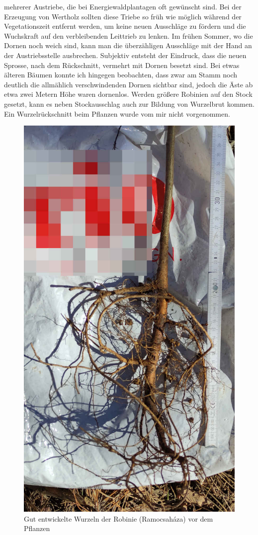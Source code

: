\documentclass[twocolumn]{scrartcl}
\begin{document}
mehrerer Austriebe, die bei Energiewaldplantagen oft gewünscht sind.
Bei der Erzeugung von Wertholz sollten diese Triebe so früh wie
möglich während der Vegetationszeit entfernt werden, um keine neuen
Ausschläge zu fördern und die Wuchskraft auf den verbleibenden
Leittrieb zu lenken.
Im frühen Sommer, wo die Dornen noch weich sind, kann man die
überzähligen Ausschläge mit der Hand an der Austriebsstelle
ausbrechen.
Subjektiv entsteht der Eindruck, dass die neuen
Sprosse, nach dem Rückschnitt, vermehrt mit Dornen besetzt sind.
Bei etwas älteren Bäumen konnte ich hingegen beobachten, dass zwar am
Stamm noch deutlich die allmählich verschwindenden Dornen sichtbar
sind, jedoch die Äste ab etwa zwei Metern Höhe waren dornenlos.
Werden größere Robinien auf den Stock gesetzt, kann es neben
Stockausschlag auch zur Bildung von Wurzelbrut kommen. Ein
Wurzelrückschnitt beim Pflanzen wurde vom mir nicht vorgenommen.

\begin{figure}[htbp]
  \centering
  \includegraphics[width=.9\linewidth]{./bild/wurzelRobinie}
  \caption{Gut entwickelte Wurzeln der Robinie (Ramocsaháza) vor dem Pflanzen}
  \label{fig:wurzelRobinie}
\end{figure}
\end{document}

